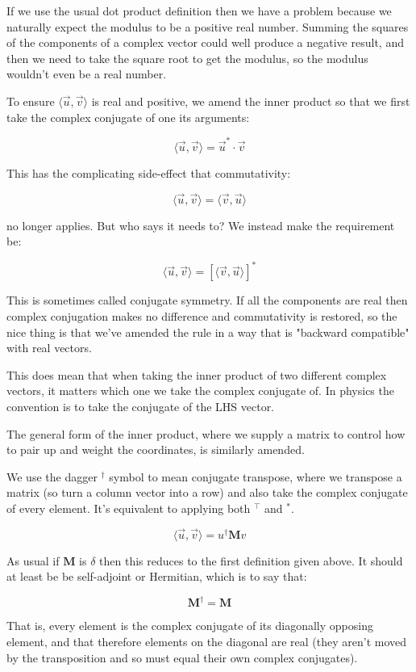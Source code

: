 If we use the usual dot product definition then we have a problem because we naturally expect the modulus to be a positive real number. Summing the squares of the components of a complex vector could well produce a negative result, and then we need to take the square root to get the modulus, so the modulus wouldn't even be a real number.

To ensure $\langle \vec{u}, \vec{v} \rangle$ is real and positive, we amend the inner product so that we first take the complex conjugate of one its arguments:

$$
\langle \vec{u}, \vec{v} \rangle
=
\vec{u}^* \cdot \vec{v}
$$

This has the complicating side-effect that commutativity:

$$
\langle \vec{u}, \vec{v} \rangle
=
\langle \vec{v}, \vec{u} \rangle
$$

no longer applies. But who says it needs to? We instead make the requirement be:

$$
\langle \vec{u}, \vec{v} \rangle
=
\left[ \langle \vec{v}, \vec{u} \rangle \right]^*
$$

This is sometimes called conjugate symmetry. If all the components are real then complex conjugation makes no difference and commutativity is restored, so the nice thing is that we've amended the rule in a way that is "backward compatible" with real vectors.

This does mean that when taking the inner product of two different complex vectors, it matters which one we take the complex conjugate of. In physics the convention is to take the conjugate of the LHS vector.

The general form of the inner product, where we supply a matrix to control how to pair up and weight the coordinates, is similarly amended.

We use the dagger $^\dagger$ symbol to mean conjugate transpose, where we transpose a matrix (so turn a column vector into a row) and also take the complex conjugate of every element. It's equivalent to applying both $^\intercal$ and $^*$.

$$
\langle \vec{u}, \vec{v} \rangle
=
u^\dagger \mathbf{M} v
$$

As usual if $\mathbf{M}$ is $\delta$ then this reduces to the first definition given above. It should at least be be self-adjoint or Hermitian, which is to say that:

$$\mathbf{M}^\dagger = \mathbf{M}$$

That is, every element is the complex conjugate of its diagonally opposing element, and that therefore elements on the diagonal are real (they aren't moved by the transposition and so must equal their own complex conjugates).

